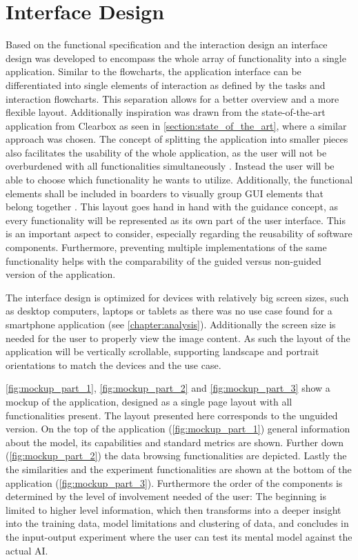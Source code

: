 \documentclass[11pt,a4paper,english]{scrreprt}
\begin{document}
\section{Interface Design}\label{section:interface_design}
Based on the functional specification and the interaction design an interface design was developed to encompass the whole array of functionality into a single application. Similar to the flowcharts, the application interface can be differentiated into single elements of interaction as defined by the tasks and interaction flowcharts. This separation allows for a better overview and a more flexible layout. Additionally inspiration was drawn from the state-of-the-art application from Clearbox as seen in \autoref{section:state_of_the_art}, where a similar approach was chosen. The concept of splitting the application into smaller pieces also facilitates the usability of the whole application, as the user will not be overburdened with all functionalities simultaneously \parencite[p.159]{demerouti_psychische_2012}. Instead the user will be able to choose which functionality he wants to utilize. Additionally, the functional elements shall be included in boarders to visually group GUI elements that belong together \parencite{kohler_gestalt_1967}. This layout goes hand in hand with the guidance concept, as every functionality will be represented as its own part of the user interface. This is an important aspect to consider, especially regarding the reusability of software components. Furthermore, preventing multiple implementations of the same functionality helps with the comparability of the guided versus non-guided version of the application.

The interface design is optimized for devices with relatively big screen sizes, such as desktop computers, laptops or tablets as there was no use case found for a smartphone application (see \autoref{chapter:analysis}). Additionally the screen size is needed for the user to properly view the image content. As such the layout of the application will be vertically scrollable, supporting landscape and portrait orientations to match the devices and the use case.

\autoref{fig:mockup_part_1}, \autoref{fig:mockup_part_2} and \autoref{fig:mockup_part_3} show a mockup of the application, designed as a single page layout with all functionalities present. The layout presented here corresponds to the unguided version. On the top of the application (\autoref{fig:mockup_part_1}) general information about the model, its capabilities and standard metrics are shown. Further down (\autoref{fig:mockup_part_2}) the data browsing functionalities are depicted. Lastly the the similarities and the experiment functionalities are shown at the bottom of the application (\autoref{fig:mockup_part_3}). Furthermore the order of the components is determined by the level of involvement needed of the user: The beginning is limited to higher level information, which then transforms into a deeper insight into the training data, model limitations and clustering of data, and concludes in the input-output experiment where the user can test its mental model against the actual AI.
\end{document}

